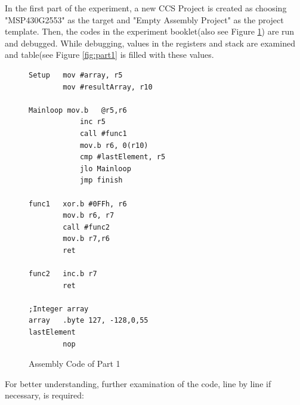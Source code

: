 \documentclass[pdftex,12pt,a4paper]{article}
\begin{document}
\newline{}
In the first part of the experiment, a new CCS Project is created as choosing "MSP430G2553" as the target and "Empty Assembly Project" as the project template. Then, the codes in the experiment booklet(also see Figure \ref{code:part1}) are run and debugged. While debugging, values in the registers and stack are examined and table(see Figure \ref{fig:part1} is filled with these values.


\begin{figure}[H]
    \centering
    \begin{lstlisting}[language={[x86masm]Assembler}]
Setup   mov #array, r5
        mov #resultArray, r10
            
Mainloop mov.b   @r5,r6
            inc r5
            call #func1
            mov.b r6, 0(r10)
            cmp #lastElement, r5
            jlo Mainloop
            jmp finish

func1   xor.b #0FFh, r6
        mov.b r6, r7
        call #func2
        mov.b r7,r6
        ret
            
func2   inc.b r7
        ret
            
;Integer array
array   .byte 127, -128,0,55
lastElement
        nop
    \end{lstlisting}
    \label{code:part1}
    \caption{Assembly Code of Part 1}
\end{figure}

For better understanding, further examination of the code, line by line if necessary, is required:
\end{document}
